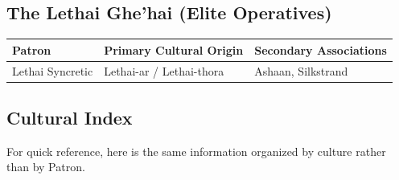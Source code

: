 \subsection{The Lethai Ghe'hai (Elite Operatives)}

\begin{longtable}{p{} p{} p{}}
\hline
\textbf{Patron} & \textbf{Primary Cultural Origin} & \textbf{Secondary Associations} \\
\hline
Lethai Syncretic & Lethai-ar / Lethai-thora & Ashaan, Silkstrand \\
\hline
\end{longtable}

\subsection{Cultural Index}

For quick reference, here is the same information organized by culture rather than by Patron.

